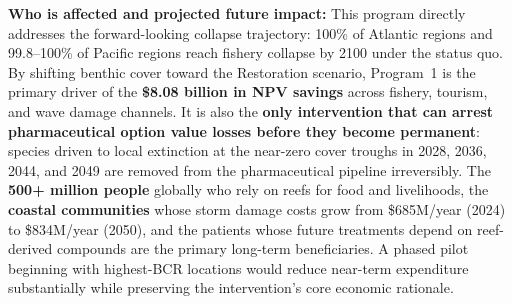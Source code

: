 \documentclass[10pt,letterpaper]{article}
\newcounter{gs}
\begin{document}
\begin{tcolorbox}[title=Program 1: Coral Reef Restoration --- \$1{,}923M Annual Total,
  colback=blue!5, colframe=blue!50!black, fonttitle=\bfseries, breakable]
  \medskip
  \textbf{Who is affected and projected future impact:} This program directly addresses the forward-looking collapse trajectory: 100\% of Atlantic regions and 99.8--100\% of Pacific regions reach fishery collapse by 2100 under the status quo. By shifting benthic cover toward the Restoration scenario, Program~1 is the primary driver of the \textbf{\$8.08 billion in NPV savings} across fishery, tourism, and wave damage channels. It is also the \textbf{only intervention that can arrest pharmaceutical option value losses before they become permanent}: species driven to local extinction at the near-zero cover troughs in 2028, 2036, 2044, and 2049 are removed from the pharmaceutical pipeline irreversibly. The \textbf{500+ million people} globally who rely on reefs for food and livelihoods, the \textbf{coastal communities} whose storm damage costs grow from \$685M/year (2024) to \$834M/year (2050), and the patients whose future treatments depend on reef-derived compounds are the primary long-term beneficiaries. A phased pilot beginning with highest-BCR locations would reduce near-term expenditure substantially while preserving the intervention's core economic rationale.
\end{tcolorbox}

\medskip
\end{document}
